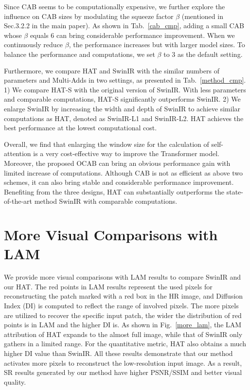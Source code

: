 \documentclass[10pt,twocolumn,letterpaper]{article}
\begin{document}
Since CAB seems to be computationally expensive, we further explore the influence on CAB sizes by modulating the squeeze factor $\beta$ (mentioned in Sec.3.2.2 in the main paper). As shown in Tab.~\ref{cab_cmp}, adding a small CAB whose $\beta$ equals 6 can bring  considerable performance improvement. When we continuously reduce $\beta$, the performance increases but with larger model sizes. To balance the performance and computations, we set $\beta$ to 3 as the default setting.

Furthermore, we compare HAT and SwinIR with the similar numbers of parameters and Multi-Adds in two settings, as presented in Tab.~\ref{method_cmp}. 1) We compare HAT-S with the original version of SwinIR. With less parameters and comparable computations, HAT-S significantly outperforms SwinIR. 2) We enlarge SwinIR by increasing the width and depth of SwinIR to achieve similar computations as HAT, denoted as SwinIR-L1 and SwinIR-L2.
HAT achieves the best performance at the lowest computational cost. 

Overall, we find that enlarging the window size for the calculation of self-attention is a very cost-effective way to improve the Transformer model. Moreover, the proposed OCAB can bring an obvious performance gain with limited increase of computations. Although CAB is not as efficient as above two schemes, it can also bring stable and considerable performance improvement. Benefiting from the three designs, HAT can substantially outperforms the state-of-the-art method SwinIR with comparable computations. 

\section{More Visual Comparisons with LAM}
We provide more visual comparisons with LAM results to compare SwinIR and our HAT. The red points in LAM results represent the used pixels for reconstructing the patch marked with a red box in the HR image, and Diffusion Index (DI) is computed to reflect the range of involved pixels. The more pixels are utilized to recover the specific input patch, the wider the distribution of red points is in LAM and the higher DI is. As shown in Fig.~\ref{more_lam}, the LAM attribution of HAT expands to the almost full image, while that of SwinIR only gathers in a limited range. For the quantitative metric, HAT also obtains a much higher DI value than SwinIR. All these results demonstrate that our method activates more pixels to reconstruct the low-resolution input image. As a result, SR results generated by our method have higher PSNR/SSIM and better visual quality.
\end{document}
